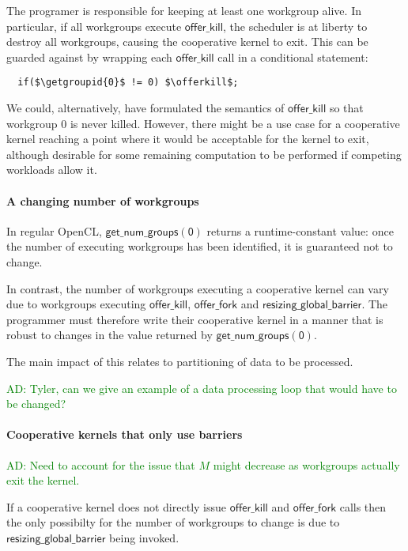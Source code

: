 \documentclass[nocopyrightspace]{sigplanconf-pldi16}
\newcommand{\ADComment}[1]{\textcolor{green}{AD: #1}}
\newcommand{\offerfork}{\mathsf{offer\_fork}}
\newcommand{\offerkill}{\mathsf{offer\_kill}}
\newcommand{\resizingglobalbarrier}{\mathsf{resizing\_global\_barrier}}
\newcommand{\getgroupid}[1]{\mathsf{get\_group\_id(#1)}}
\newcommand{\getnumgroups}[1]{\mathsf{get\_num\_groups(#1)}}
\begin{document}
The programer is responsible for keeping at least one workgroup alive.  In particular, if all workgroups execute $\offerkill$, the scheduler is at liberty to destroy all workgroups, causing the cooperative kernel to exit.  This can be guarded against by wrapping each $\offerkill$ call in a conditional statement:

\lstset{basicstyle=\tt}
\begin{lstlisting}
  if($\getgroupid{0}$ != 0) $\offerkill$;
\end{lstlisting}
\lstset{basicstyle=\scriptsize\tt}

We could, alternatively, have formulated the semantics of $\offerkill$
so that workgroup 0 is never killed.  However, there might be a use
case for a cooperative kernel reaching a point where it would be
acceptable for the kernel to exit, although desirable for some
remaining computation to be performed if competing workloads allow it.

\paragraph{A changing number of workgroups}

In regular OpenCL, $\getnumgroups{0}$ returns a runtime-constant
value: once the number of executing workgroups has been identified, it
is guaranteed not to change.

In contrast, the number of workgroups executing a cooperative kernel
can vary due to workgroups executing $\offerkill$, $\offerfork$ and
$\resizingglobalbarrier$.  The programmer must therefore write their
cooperative kernel in a manner that is robust to changes in the value
returned by $\getnumgroups{0}$.

The main impact of this relates to partitioning of data to be
processed.

\ADComment{Tyler, can we give an example of a data processing loop
  that would have to be changed?}

\paragraph{Cooperative kernels that only use barriers}

\ADComment{Need to account for the issue that $M$ might decrease as
  workgroups actually exit the kernel.}

If a cooperative kernel does not directly issue $\offerkill$ and
$\offerfork$ calls then the only possibilty for the number of
workgroups to change is due to $\resizingglobalbarrier$ being invoked.
\end{document}

